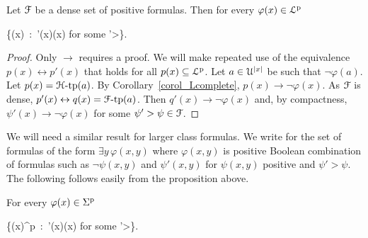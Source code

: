 \documentclass[10pt,oneside]{amsproc}
\renewcommand*{\emph}[1]{%
   \smash{\tikz[baseline]\node[rectangle, fill=teal!25, rounded corners, inner xsep=0.5ex, inner ysep=0.2ex, anchor=base, minimum height = 2.7ex]{\strut #1};}}
\begin{document}


\begin{proposition}\label{prop_Fapprox}
  Let ${\EuScript F}$ be a dense set of positive formulas.
  Then for every $\varphi(x)\in{\EuScript L}^{\rm p}$
  
  {\leftrightarrow}
  {\bigvee\big\{\psi(x)\ :\ \psi'(x)\rightarrow\neg\varphi(x)\textrm{ for some }\psi'>\psi\big\}.}
\end{proposition}
 
\begin{proof}
  Only $\rightarrow$ requires a proof.
  We will make repeated use of the equivalence $p(x)\leftrightarrow p'(x)$ that holds for all $p(x)\subseteq{\EuScript L}^{\rm p}$.
  Let $a\in {\EuScript U}^{|x|}$ be such that $\neg\varphi(a)$.
  Let $p(x)={\EuScript H}\mbox{-tp}(a)$.
  By Corollary~\ref{corol_Lcomplete}, $p(x)\rightarrow\neg\varphi(x)$.
  As ${\EuScript F}$ is dense, $p'(x)\leftrightarrow q(x)={\EuScript F}\mbox{-tp}(a)$.
  Then $q'(x)\rightarrow\neg\varphi(x)$ and, by compactness, $\psi'(x)\rightarrow\neg\varphi(x)$ for some $\psi'>\psi\in{\EuScript F}$.
\end{proof}

We will need a similar result for larger class formulas.
We write \emph{$\Sigma^{\rm p}$\/} for the set of formulas of the form $\exists y\,\varphi(x,y)$ where $\varphi(x,y)$ is positive Boolean combination of formulas such as $\neg\psi(x,y)$ and $\psi'(x,y)$ for $\psi(x,y)$ positive and $\psi'>\psi$.
The following follows easily from the proposition above.

\begin{proposition}\label{prop_Sigma_approx}
  For every $\varphi(x)\in\Sigma^{\rm p}$
  
  {\leftrightarrow}
  {\bigvee\big\{\psi(x)^{\rm p}\ :\ \psi'(x)\rightarrow\varphi(x)\textrm{ for some }\psi'>\psi\big\}.}
\end{proposition}
 
\end{document}
